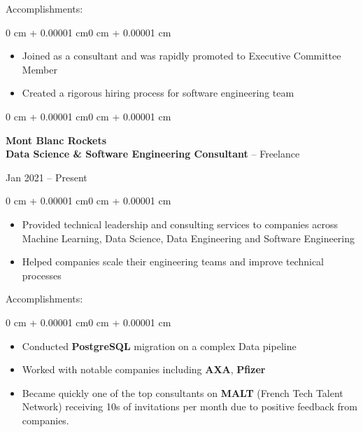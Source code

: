 \documentclass[10pt, letterpaper]{article}
\newenvironment{highlights}{
    \begin{itemize}[
        topsep=0.10 cm,
        parsep=0.10 cm,
        partopsep=0pt,
        itemsep=0pt,
        leftmargin=1.5 cm
    ]
}{
    \end{itemize}
}
\newenvironment{highlightsforbulletentries}{
    \begin{itemize}[
        topsep=0.10 cm,
        parsep=0.10 cm,
        partopsep=0pt,
        itemsep=0pt,
        leftmargin=1.5 cm
    ]
}{
    \end{itemize}
}
\newenvironment{onecolentry}{
    \begin{adjustwidth}{0 cm + 0.00001 cm}{0 cm + 0.00001 cm}
}{
    \end{adjustwidth}
}
\newenvironment{twocolentry}[2][]{
    \onecolentry
    \def\secondColumn{#2}
    \setcolumnwidth{\fill, 4.5 cm}
    \begin{paracol}{2}
}{
    \switchcolumn \raggedleft \secondColumn
    \end{paracol}
    \endonecolentry
}
\begin{document}
    Accomplishments:
    \begin{onecolentry}
        \begin{highlightsforbulletentries}
            \item Joined as a consultant and was rapidly promoted to Executive Committee Member
            \item Created a rigorous hiring process for software engineering team
        \end{highlightsforbulletentries}
    \end{onecolentry}

    \vspace{0.5cm}

    \begin{twocolentry}{Jan 2021 -- Present}
        \textbf{Mont Blanc Rockets} \\
        \textbf{Data Science \& Software Engineering Consultant} -- Freelance
    \end{twocolentry}
    \begin{onecolentry}
        \begin{highlights}
            \item Provided technical leadership and consulting services to companies across Machine Learning, Data Science, Data Engineering and Software Engineering
            \item Helped companies scale their engineering teams and improve technical processes
        \end{highlights}
    \end{onecolentry}

    Accomplishments:
    \begin{onecolentry}
        \begin{highlightsforbulletentries}
            \item Conducted \textbf{PostgreSQL} migration on a complex Data pipeline
            \item Worked with notable companies including \textbf{AXA}, \textbf{Pfizer}
            \item Became quickly one of the top consultants on \textbf{MALT} (French Tech Talent Network) receiving 10s of invitations per month due to positive feedback from companies.
        \end{highlightsforbulletentries}
    \end{onecolentry}

    \vspace{0.5cm}
\end{document}
